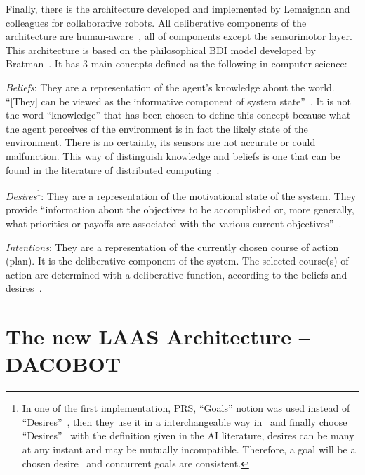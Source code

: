 \documentclass[a4paper,11pt,twoside]{StyleThese}
\begin{document}
Finally, there is the architecture developed and implemented by Lemaignan and colleagues for collaborative robots. All deliberative components of the architecture are human-aware~\cite{lemaignan_2017_artificial}, \ie all of components except the sensorimotor layer. This architecture is based on the philosophical BDI model developed by Bratman~\cite{bratman_1987_intention,bratman_1988_plans}. It has 3 main concepts defined as the following in computer science:
\begin{bulletList}
	\item \emph{Beliefs}: They are a representation of the agent’s knowledge about the world. ``[They] can be viewed as the informative component of system state''~\cite[p.~313]{rao_1995_bdi}. It is not the word ``knowledge'' that has been chosen to define this concept because what the agent perceives of the environment is in fact the likely state of the environment. There is no certainty, its sensors are not accurate or could malfunction. This way of distinguish knowledge and beliefs is one that can be found in the literature of distributed computing~\cite{lamarre_1994_knowledge}.
	\item \emph{Desires}\footnote{In one of the first implementation, PRS, ``Goals'' notion was used instead of ``Desires''~\cite{georgeff_1989_decision}, then they use it in a interchangeable way in~\cite{georgeff_1991_modeling} and finally choose ``Desires''~\cite{rao_1995_bdi} with the definition given in the AI literature, \eg desires can be many at any instant and may be mutually incompatible. Therefore, a goal will be a chosen desire~\cite{cohen_1990_intention} and concurrent goals are consistent.}: They are a representation of the motivational state of the system. They provide ``information about the objectives to be accomplished or, more generally, what priorities or payoffs are associated with the various current objectives''~\cite{rao_1995_bdi}. 
	\item \emph{Intentions}: They are a representation of the currently chosen course of action (plan). It is the deliberative component of the system. The selected course(s) of action are determined with a deliberative function, according to the beliefs and desires~\cite{rao_1995_bdi}.
\end{bulletList}



\section{The new LAAS Architecture -- DACOBOT}\label{chap3:sec:rob_archi}
\end{document}
